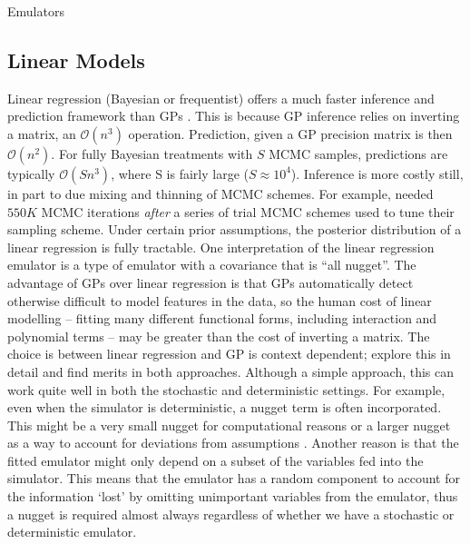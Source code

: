 \begin{chapter}{Emulators \label{Ch:Emulators}}
\subsection{Linear Models}
Linear regression (Bayesian or frequentist) offers a much faster inference and prediction framework than GPs \citep{Rougier2009}. This is because GP inference relies on inverting a matrix, an $\mathcal{O}(n^3)$ operation. Prediction, given a GP precision matrix is then $\mathcal{O}(n^2)$. For fully Bayesian treatments with $S$ MCMC samples, predictions are typically $\mathcal{O}(S n^3)$, where S is fairly large ($S\approx10^4$). Inference is more costly still, in part to due mixing and thinning of MCMC schemes. For example, \citet{Baggaley2012} needed $550K$ MCMC iterations \textit{after} a series of trial MCMC schemes used to tune their sampling scheme. Under certain prior assumptions, the posterior distribution of a linear regression is fully tractable. One interpretation of the linear regression emulator is a type of emulator with a covariance that is ``all nugget''. The advantage of GPs over linear regression is that GPs automatically detect otherwise difficult to model features in the data, so the human cost of linear modelling -- fitting many different functional forms, including interaction and polynomial terms -- may be greater than the cost of inverting a matrix. The choice is between linear regression and GP is context dependent; \citet{Salter2016} explore this in detail and find merits in both approaches.
Although a simple approach, this can work quite well in both the stochastic and deterministic settings. For example, even when the simulator is deterministic, a nugget term is often incorporated. This might be a very small nugget for computational reasons or a larger nugget as a way to account for deviations from assumptions \citep{Gramacy12}. Another reason is that the fitted emulator might only depend on a subset of the variables fed into the simulator. This means that the emulator has a random component to account for the information `lost' by omitting unimportant variables from the emulator, thus a nugget is required almost always regardless of whether we have a stochastic or deterministic emulator.

\end{chapter}
